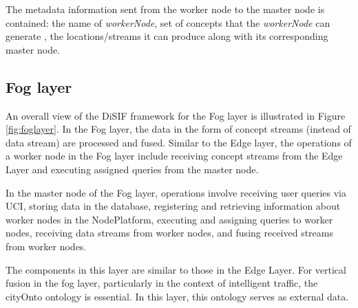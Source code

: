 \documentclass[5p,times]{elsarticle}
\begin{document}
The metadata information sent from the worker node to the master node is contained:
the name of \textit{workerNode}, set of concepts that the \textit{workerNode} can 
generate
, the locations/streams it can produce along with its corresponding master node.




\subsection{Fog layer}








An overall view of the DiSIF framework for the Fog layer is illustrated in Figure \ref{fig:foglayer}.
In the Fog layer, the data in the form of concept streams (instead of data stream) are processed and fused. Similar to the Edge layer, the operations of a worker node in the Fog layer include receiving concept streams from the Edge Layer and executing assigned queries from the master node.

In the master node of the Fog layer, operations involve receiving user queries via UCI, storing data in the database, registering and retrieving information about worker nodes in the NodePlatform, executing and assigning queries to worker nodes, receiving data streams from worker nodes, and fusing received streams from worker nodes.

The components in this layer are similar to those in the Edge Layer.
 For vertical fusion in the fog layer, particularly in the context of intelligent traffic, 
 the cityOnto ontology is essential. In this layer, this ontology serves as external data.
\end{document}
